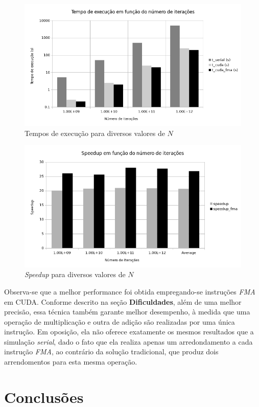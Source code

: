\documentclass[12pt]{article}
\begin{document}
\begin{figure}
  \centering
  \includegraphics[width=0.9\linewidth]{img/time}
  \caption{Tempos de execução para diversos valores de \(N\)}
  \label{fig:time}
\end{figure}

\begin{figure}
  \centering
  \includegraphics[width=0.9\linewidth]{img/speedup}
  \caption{\textit{Speedup} para diversos valores de \(N\)}
  \label{fig:speedup}
\end{figure}

Observa-se que a melhor performance foi obtida empregando-se instruções
\textit{FMA} em CUDA. Conforme descrito na seção \textbf{Dificuldades}, além de
uma melhor precisão, essa técnica também garante melhor desempenho, à medida que
uma operação de multiplicação e outra de adição são realizadas por uma única
instrução. Em oposição, ela não oferece exatamente os mesmos resultados que a
simulação \textit{serial}, dado o fato que ela realiza apenas um arredondamento
a cada instrução \textit{FMA}, ao contrário da solução tradicional, que produz
dois arrendomentos para esta mesma operação.

\section{Conclusões}
\end{document}
